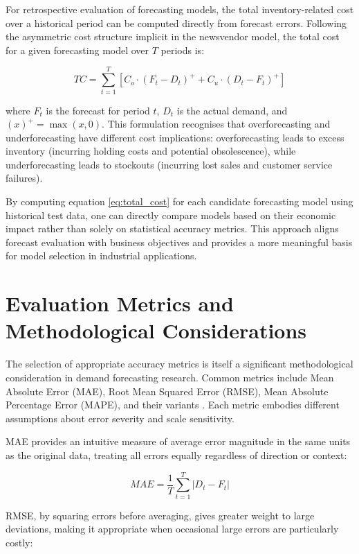 \documentclass[ENG]{TFUOC}%
\begin{document}
For retrospective evaluation of forecasting models, the total inventory-related cost over a historical period can be computed directly from forecast errors. Following the asymmetric cost structure implicit in the newsvendor model, the total cost for a given forecasting model over $T$ periods is:

\begin{equation}
TC = \sum_{t=1}^{T} \left[ C_o \cdot (F_t - D_t)^+ + C_u \cdot (D_t - F_t)^+ \right]
\label{eq:total_cost}
\end{equation}

\noindent where $F_t$ is the forecast for period $t$, $D_t$ is the actual demand, and $(x)^+ = \max(x, 0)$. This formulation recognises that overforecasting and underforecasting have different cost implications: overforecasting leads to excess inventory (incurring holding costs and potential obsolescence), while underforecasting leads to stockouts (incurring lost sales and customer service failures).

By computing equation \ref{eq:total_cost} for each candidate forecasting model using historical test data, one can directly compare models based on their economic impact rather than solely on statistical accuracy metrics. This approach aligns forecast evaluation with business objectives and provides a more meaningful basis for model selection in industrial applications.

\section{Evaluation Metrics and Methodological Considerations}

The selection of appropriate accuracy metrics is itself a significant 
methodological consideration in demand forecasting research. Common 
metrics include Mean Absolute Error (MAE), Root Mean Squared Error 
(RMSE), Mean Absolute Percentage Error (MAPE), and their variants 
\citep{vandeput2024forecast}. Each metric embodies different assumptions 
about error severity and scale sensitivity.

MAE provides an intuitive measure of average error magnitude in the 
same units as the original data, treating all errors equally regardless 
of direction or context:

\begin{equation}
    MAE = \frac{1}{T} \sum_{t=1}^{T} |D_t - F_t|
\end{equation}

RMSE, by squaring errors before averaging, gives greater weight to 
large deviations, making it appropriate when occasional large errors 
are particularly costly:
\end{document}
